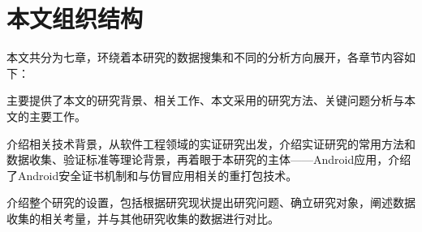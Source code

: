%
%
%
%
\section{本文组织结构}
本文共分为七章，环绕着本研究的数据搜集和不同的分析方向展开，各章节内容如下：

 主要提供了本文的研究背景、相关工作、本文采用的研究方法、关键问题分析与本文的主要工作。

 介绍相关技术背景，从软件工程领域的实证研究出发，介绍实证研究的常用方法和数据收集、验证标准等理论背景，再着眼于本研究的主体——Android应用，介绍了Android安全证书机制和与仿冒应用相关的重打包技术。

 介绍整个研究的设置，包括根据研究现状提出研究问题、确立研究对象，阐述数据收集的相关考量，并与其他研究收集的数据进行对比。

